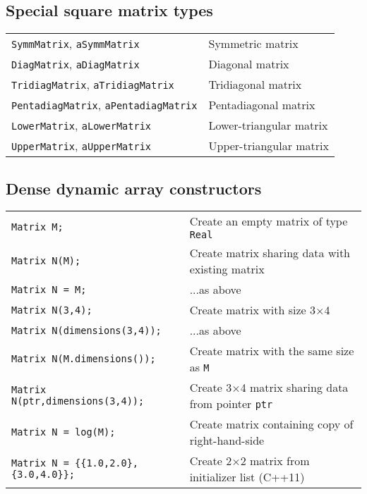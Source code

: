\documentclass[10pt,a4,landscape]{article}
\def\code#1{\texttt{#1}}
\begin{document}
\subsection*{Special square matrix types}
\begin{tabular}{ll}
\code{SymmMatrix}, \code{aSymmMatrix} & Symmetric matrix\\
\code{DiagMatrix}, \code{aDiagMatrix} & Diagonal matrix\\
\code{TridiagMatrix}, \code{aTridiagMatrix} & Tridiagonal matrix\\
\code{PentadiagMatrix}, \code{aPentadiagMatrix} & Pentadiagonal matrix\\
\code{LowerMatrix}, \code{aLowerMatrix} & Lower-triangular matrix\\
\code{UpperMatrix}, \code{aUpperMatrix} & Upper-triangular matrix\\
\end{tabular}
\subsection*{Dense dynamic array constructors}
\begin{tabular}{ll}
\code{Matrix M;} & Create an empty matrix of type \code{Real}\\
\code{Matrix N(M);} & Create matrix sharing data with existing matrix\\
\code{Matrix N = M;} & ...as above\\
\code{Matrix N(3,4);} & Create matrix with size 3$\times$4\\
\code{Matrix N(dimensions(3,4));} & ...as above\\
\code{Matrix N(M.dimensions());} & Create matrix with the same size as \code{M}\\
\code{Matrix N(ptr,dimensions(3,4));} & Create 3$\times$4 matrix sharing data from pointer \code{ptr}\\
\code{Matrix N = log(M);} & Create matrix containing copy of right-hand-side\\
\code{Matrix N = \{\{1.0,2.0\},\{3.0,4.0\}\};} & Create 2$\times$2 matrix from initializer list (C++11)\\
\end{tabular}
\end{document}
